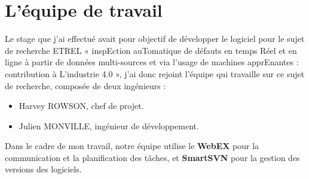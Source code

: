 \newpage
\section{L'équipe de travail}
Le stage que j'ai effectué avait pour objectif de développer le logiciel pour le sujet de recherche ETREL « inspEction auTomatique de défauts en temps Réel et en ligne à partir de données multi-sources et via l’usage de machines apprEnantes : 
contribution à L’industrie 4.0 », j’ai donc rejoint l’équipe qui travaille sur ce sujet de recherche, composée de deux ingénieurs : 
\begin{itemize}
\item Harvey ROWSON, chef de projet.
\item Julien MONVILLE, ingénieur de développement.
\end{itemize}
Dans le cadre de mon travail, notre équipe utilise le \textbf{WebEX} pour la communication et la planification des tâches, et \textbf{SmartSVN} pour la gestion des versions des logiciels.
